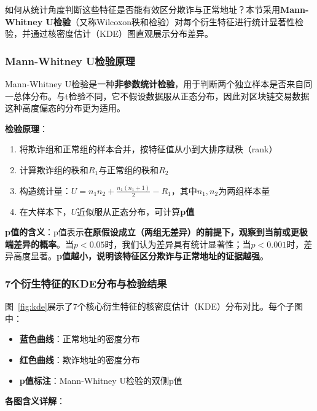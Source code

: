 \documentclass[12pt,a4paper]{article}
\begin{document}
如何从统计角度判断这些特征是否能有效区分欺诈与正常地址？本节采用\textbf{Mann-Whitney U检验}（又称Wilcoxon秩和检验）对每个衍生特征进行统计显著性检验，并通过核密度估计（KDE）图直观展示分布差异。

\subsubsection{Mann-Whitney U检验原理}

Mann-Whitney U检验是一种\textbf{非参数统计检验}，用于判断两个独立样本是否来自同一总体分布。与t检验不同，它不假设数据服从正态分布，因此对区块链交易数据这种高度偏态的分布更为适用。

\textbf{检验原理}：
\begin{enumerate}
    \item 将欺诈组和正常组的样本合并，按特征值从小到大排序赋秩（rank）
    \item 计算欺诈组的秩和$R_1$与正常组的秩和$R_2$
    \item 构造统计量：$U = n_1 n_2 + \frac{n_1(n_1+1)}{2} - R_1$，其中$n_1, n_2$为两组样本量
    \item 在大样本下，$U$近似服从正态分布，可计算\textbf{p值}
\end{enumerate}

\textbf{p值的含义}：p值表示\textbf{在原假设成立（两组无差异）的前提下，观察到当前或更极端差异的概率}。当$p < 0.05$时，我们认为差异具有统计显著性；当$p < 0.001$时，差异高度显著。\textbf{p值越小，说明该特征区分欺诈与正常地址的证据越强}。

\subsubsection{7个衍生特征的KDE分布与检验结果}

图~\ref{fig:kde}展示了7个核心衍生特征的核密度估计（KDE）分布对比。每个子图中：
\begin{itemize}
    \item \textbf{蓝色曲线}：正常地址的密度分布
    \item \textbf{红色曲线}：欺诈地址的密度分布
    \item \textbf{p值标注}：Mann-Whitney U检验的双侧p值
\end{itemize}

\textbf{各图含义详解}：
\end{document}
